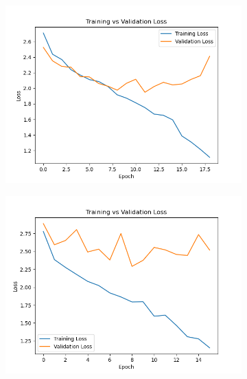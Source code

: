 \documentclass{article}
\begin{document}
    \begin{figure}[H]
      \centering
      \begin{subfigure}[b]{0.45\textwidth}
        \centering
        \includegraphics[width=\textwidth]{figs/loss_curve_1.png}
        \caption{}
        \label{fig:loss_curve_1}
      \end{subfigure}
      \hfill
      \begin{subfigure}[b]{0.45\textwidth}
        \centering
        \includegraphics[width=\textwidth]{figs/loss_curve_2.png}
        \caption{}
        \label{fig:loss_curve_2}
      \end{subfigure}
      
      \vspace{0.5em}
      

\end{figure}
\end{document}
